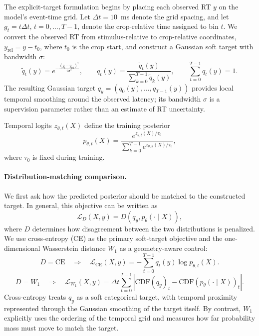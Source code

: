\documentclass[12pt]{article}
\begin{document}
The explicit-target formulation begins by placing each observed RT \(y\) on the
model's event-time grid. Let \(\Delta t=10\)~ms denote the grid spacing, and let
\(g_t=t\Delta t\), \(t=0,\ldots,T-1\), denote the crop-relative time assigned to
bin \(t\). We convert the observed RT from stimulus-relative to crop-relative
coordinates, \(y_{\mathrm{rel}}=y-t_0\), where $t_0$ is the crop start, and
construct a Gaussian soft target with bandwidth $\sigma$:
\begin{equation}
\label{eq:rt_soft_target}
\tilde q_t(y)
=e^{-\frac{(g_t-y_{\mathrm{rel}})^2}{2\sigma^2}},
\qquad
q_t(y)
=\frac{\tilde q_t(y)}{\sum_{k=0}^{T-1}\tilde q_k(y)},
\qquad
\sum_{t=0}^{T-1}q_t(y)=1.
\end{equation}
The resulting Gaussian target $q_y=(q_0(y),\ldots,q_{T-1}(y))$ provides local
temporal smoothing around the observed latency; its bandwidth $\sigma$ is a
supervision parameter rather than an estimate of RT uncertainty.

Temporal logits $z_{\theta,t}(X)$ define the training posterior
\begin{equation}
\label{eq:rt_pred_dist}
p_{\theta,t}(X)
=\frac{e^{z_{\theta,t}(X)/\tau_0}}
{\sum_{k=0}^{T-1}e^{z_{\theta,k}(X)/\tau_0}},
\end{equation}
where $\tau_0$ is fixed during training.

\paragraph{Distribution-matching comparison.}
We first ask how the predicted posterior should be matched to the constructed
target. In general, this objective can be written as
\begin{equation}
\label{eq:rt_loss}
\mathcal{L}_{D}(X,y)
=D\!\left(q_y,p_\theta(\cdot\mid X)\right),
\end{equation}
where $D$ determines how disagreement between the two distributions is
penalized. We use cross-entropy (CE) as the primary soft-target objective and the
one-dimensional Wasserstein distance $W_1$ as a geometry-aware control:
\begin{equation}
D=\mathrm{CE}
\quad\Longrightarrow\quad
\mathcal{L}_{\mathrm{CE}}(X,y)
=-\sum_{t=0}^{T-1}q_t(y)\log p_{\theta,t}(X).
\end{equation}
\begin{equation}
D=W_1
\quad\Longrightarrow\quad
\mathcal{L}_{W_1}(X,y)
=\Delta t\sum_{t=0}^{T-1}
\left|\mathrm{CDF}(q_y)_t
-\mathrm{CDF}\!\left(p_\theta(\cdot\mid X)\right)_t\right|.
\end{equation}
Cross-entropy treats $q_y$ as a soft categorical target, with temporal proximity
represented through the Gaussian smoothing of the target itself. By contrast,
$W_1$ explicitly uses the ordering of the temporal grid and measures how far
probability mass must move to match the target.
\end{document}
